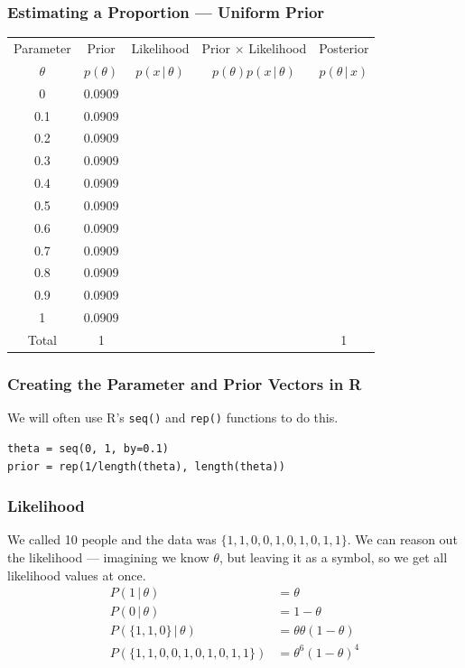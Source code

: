 \documentclass{beamer}
\newcommand{\given}{\,|\,}
\begin{document}
\begin{frame}
\frametitle{Estimating a Proportion --- Uniform Prior}

\centering
{\footnotesize
\begin{tabular}{|c|c|c|c|c|}
\hline
Parameter & Prior & Likelihood & Prior $\times$ Likelihood & Posterior \\
$\theta$  & $p(\theta)$ & $p(x \given \theta)$ & $p(\theta)p(x\given\theta)$ & $p(\theta\given x)$ \\
\hline
0 & 0.0909 & & & \\
0.1 & 0.0909  &  & & \\
0.2 & 0.0909  &  & & \\
0.3 & 0.0909 &  & & \\
0.4 & 0.0909  &  & & \\
0.5 & 0.0909 & & & \\
0.6 & 0.0909 & & & \\
0.7 & 0.0909 & & & \\
0.8 & 0.0909 & & & \\
0.9 & 0.0909 & & & \\
1   & 0.0909 & & & \\
\hline
Total & 1 & & & 1 \\
\hline
\end{tabular}
}

\end{frame}


\begin{frame}[fragile]
\frametitle{Creating the Parameter and Prior Vectors in R}
We will often use R's \texttt{seq()} and
\texttt{rep()} functions to do this.\pause

\begin{verbatim}
theta = seq(0, 1, by=0.1)
prior = rep(1/length(theta), length(theta))
\end{verbatim}

\end{frame}

\begin{frame}
\frametitle{Likelihood}
We called 10 people and the data was
$\{1, 1, 0, 0, 1, 0, 1, 0, 1, 1\}$. We can reason out the likelihood
--- imagining we know $\theta$, but leaving it as a symbol, so we get
all likelihood values at once.\pause
\begin{align}
P(1 \given \theta) &= \theta \\
P(0 \given \theta) &= 1-\theta \\
P(\{1, 1, 0\} \given \theta) &= \theta\theta(1-\theta) \\
P(\{1, 1, 0, 0, 1, 0, 1, 0, 1, 1\}) &= \theta^6(1-\theta)^4
\end{align}



\end{frame}
\end{document}
